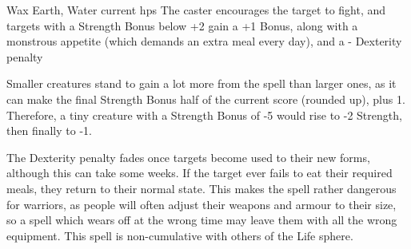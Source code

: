   {}%
  {Wax}%
  {Earth, Water}%
  {current \glspl{hp}}%
  {The caster encourages the target to fight, and targets with a Strength Bonus below +2 gain a +1 Bonus, along with a monstrous appetite (which demands an extra meal every day), and a - Dexterity penalty}%
  {
  Smaller creatures stand to gain a lot more from the spell than larger ones, as it can make the final Strength Bonus half of the current score (rounded up), plus 1.
  Therefore, a tiny creature with a Strength Bonus of -5 would rise to -2 Strength, then finally to -1.

    The Dexterity penalty fades once targets become used to their new forms, although this can take some weeks.
    If the target ever fails to eat their required meals, they return to their normal state.
    This makes the spell rather dangerous for warriors, as people will often adjust their weapons and armour to their size, so a spell which wears off at the wrong time may leave them with all the wrong equipment.
    This spell is non-cumulative with others of the Life sphere.}
